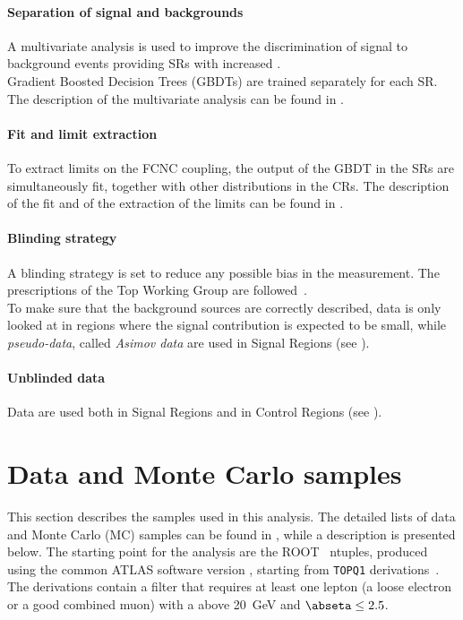 \paragraph{Separation of signal and backgrounds}
A multivariate analysis is used to improve the discrimination of
signal to background events providing SRs with increased \ssb. \\
Gradient Boosted Decision Trees (GBDTs) are trained separately for each SR. 
The description of the multivariate analysis can be found in
. 

\paragraph{Fit and limit extraction}
To extract limits on the FCNC \tZc coupling, the output of the
GBDT in the SRs are simultaneously fit, together with other 
distributions in the CRs.
The description of the fit and of the extraction of the limits can be
found in .

\paragraph{Blinding strategy}
A blinding strategy is set to reduce any possible bias in the measurement. 
The prescriptions of the Top Working Group are followed~\cite{top:blind}.\\
To make sure that the background sources are correctly described,
data is only looked at in regions where the signal contribution is expected to be small, while 
\textit{pseudo-data}, called \textit{Asimov data} are used in Signal Regions (see ). 

\paragraph{Unblinded data }
Data are used both in Signal Regions and in Control Regions (see ). 

\section{Data and Monte Carlo samples}
\label{sec:samples}
This section describes the samples used in this analysis.
The detailed lists of data and Monte Carlo (MC) samples can be found
in \App{\ref{appendix:app_mc}}, 
while a description is presented below.
The starting point for the analysis are the ROOT~\cite{Antcheva:2009zz} ntuples, produced using the common ATLAS software version
\anabasevers, starting from \texttt{TOPQ1} derivations~\cite{top:deriv}.\\
The derivations contain a filter that requires at least one lepton
(a loose electron or a good combined muon) with a \pT above \SI{20}{\GeV} and $\abseta \leq 2.5$. 

